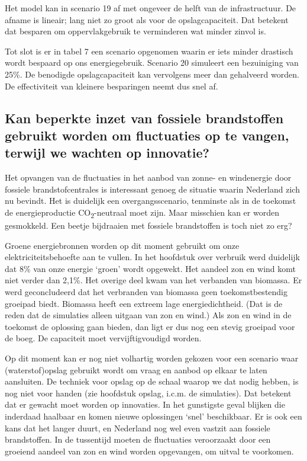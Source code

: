 \documentclass[
  11pt,
  a4paper,
]{book}
\begin{document}
Het model kan in scenario 19 af met ongeveer de helft van de infrastructuur. De afname is lineair; lang niet zo groot als voor de opslagcapaciteit. Dat betekent dat besparen om oppervlakgebruik te verminderen wat minder zinvol is.

\bigskip\noindent
Tot slot is er in tabel 7 een scenario opgenomen waarin er iets minder drastisch wordt bespaard op ons energiegebruik. Scenario 20 simuleert een bezuiniging van 25\%. De benodigde opslagcapaciteit kan vervolgens meer dan gehalveerd worden. De effectiviteit van kleinere besparingen neemt dus snel af.

\newpage

\hypertarget{kan-beperkte-inzet-van-fossiele-brandstoffen-gebruikt-worden-om-fluctuaties-op-te-vangen-terwijl-we-wachten-op-innovatie}{%
\subsection{Kan beperkte inzet van fossiele brandstoffen gebruikt worden om fluctuaties op te vangen, terwijl we wachten op innovatie?}\label{kan-beperkte-inzet-van-fossiele-brandstoffen-gebruikt-worden-om-fluctuaties-op-te-vangen-terwijl-we-wachten-op-innovatie}}

Het opvangen van de fluctuaties in het aanbod van zonne- en windenergie door fossiele brandstofcentrales is interessant genoeg de situatie waarin Nederland zich nu bevindt. Het is duidelijk een overgangsscenario, tenminste als in de toekomst de energieproductie CO\textsubscript{2}-neutraal moet zijn. Maar misschien kan er worden gesmokkeld. Een beetje bijdraaien met fossiele brandstoffen is toch niet zo erg?

Groene energiebronnen worden op dit moment gebruikt om onze elektriciteitsbehoefte aan te vullen. In het hoofdstuk over verbruik werd duidelijk dat 8\% van onze energie `groen' wordt opgewekt. Het aandeel zon en wind komt niet verder dan 2,1\%. Het overige deel kwam van het verbanden van biomassa. Er werd geconcludeerd dat het verbranden van biomassa geen toekomstbestendig groeipad biedt. Biomassa heeft een extreem lage energiedichtheid. (Dat is de reden dat de simulaties alleen uitgaan van zon en wind.) Als zon en wind in de toekomst de oplossing gaan bieden, dan ligt er dus nog een stevig groeipad voor de boeg. De capaciteit moet vervijftigvoudigd worden.

Op dit moment kan er nog niet volhartig worden gekozen voor een scenario waar (waterstof)opslag gebruikt wordt om vraag en aanbod op elkaar te laten aansluiten. De techniek voor opslag op de schaal waarop we dat nodig hebben, is nog niet voor handen (zie hoofdstuk opslag, i.c.m. de simulaties). Dat betekent dat er gewacht moet worden op innovaties. In het gunstigste geval blijken die inderdaad haalbaar en komen nieuwe oplossingen `snel' beschikbaar. Er is ook een kans dat het langer duurt, en Nederland nog wel even vastzit aan fossiele brandstoffen. In de tussentijd moeten de fluctuaties veroorzaakt door een groeiend aandeel van zon en wind worden opgevangen, om uitval te voorkomen.
\end{document}
